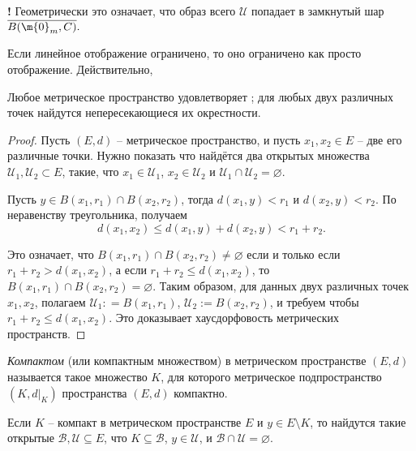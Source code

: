 \begin{mydanger}{\bf{!}}
    Геометрически это означает, что образ всего $\mathscr{U}$ попадает в замкнутый шар $\overline{B(\m{0}_m, C)}.$
\end{mydanger}



\begin{remark}
    Если линейное отображение ограничено, то оно ограничено как просто отображение. Действительно, 
\end{remark}






\begin{lemma}\label{metric=hausdorff}
    Любое метрическое пространство удовлетворяет ; для любых двух различных точек найдутся непересекающиеся их окрестности.
\end{lemma}
\begin{proof}
    Пусть $(E,d)$ -- метрическое пространство, и пусть $x_1,x_2 \in E$ -- две его различные точки. Нужно показать что найдётся два открытых множества $\mathscr{U}_1, \mathscr{U}_2 \subset E$, такие, что $x_1\in \mathscr{U}_1$, $x_2\in \mathscr{U}_2$ и $\mathscr{U}_1\cap \mathscr{U}_2 = \varnothing.$

   Пусть $y \in B(x_1,r_1) \cap B(x_2,r_2)$, тогда $d(x_1,y)<r_1$ и $d(x_2,y)<r_2$. По неравенству треугольника, получаем
    \[
     d(x_1,x_2) \le d(x_1,y) + d(x_2,y)< r_1 +r_2.
    \]

    Это означает, что $B(x_1,r_1) \cap B(x_2,r_2) \ne \varnothing$ если и только если $r_1+r_2 > d(x_1,x_2)$, а если $r_1+r_2 \le d(x_1,x_2)$, то $B(x_1,r_1) \cap B(x_2,r_2) = \varnothing$. Таким образом, для данных двух различных точек $x_1,x_2$, полагаем $\mathscr{U}_1: = B(x_1,r_1)$, $\mathscr{U}_2:=B(x_2,r_2)$, и требуем чтобы $r_1+r_2 \le d(x_1,x_2)$. Это доказывает хаусдорфовость метрических пространств. 
\end{proof}

\begin{definition}
\textit{Компактом} (или компактным множеством) в метрическом пространстве $(E,d)$ называется такое множество $K$, для которого метрическое подпространство $(K,d|_K)$ пространства $(E,d)$ компактно.
\end{definition}

\begin{proposition}\label{for_compact}
    Если $K$ -- компакт в метрическом пространстве $E$ и $y \in E \setminus K$, то найдутся такие открытые $\mathscr{B}, \mathscr{U} \subseteq E$, что $K \subseteq \mathscr{B}$, $y \in \mathscr{U}$, и $\mathscr{B}\cap \mathscr{U} = \varnothing.$ 
\end{proposition}

